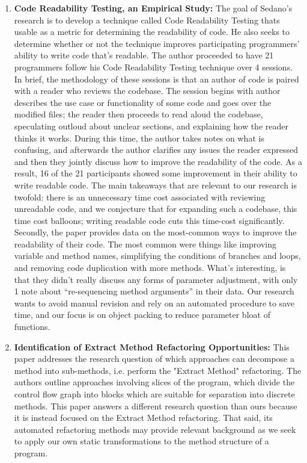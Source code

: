 \documentclass{article}
\begin{document}
\begin{enumerate}
    \item \textbf{Code Readability Testing, an Empirical Study:} The goal of Sedano’s research is to develop a technique called Code Readability Testing thats usable as a metric for determining the readability of code. He also seeks to determine whether or not the technique improves participating programmers’ ability to write code that’s readable. The author proceeded to have 21 programmers follow his Code Readability Testing technique over 4 sessions. In brief, the methodology of these sessions is that an author of code is paired with a reader who reviews the codebase. The session begins with author describes the use case or functionality of some code and goes over the modified files; the reader then proceeds to read aloud the codebase, speculating outloud about unclear sections, and explaining how the reader thinks it works. During this time, the author takes notes on what is confusing, and afterwards the author clarifies any issues the reader expressed and then they jointly discuss how to improve the readability of the code. As a result, 16 of the 21 participants showed some improvement in their ability to write readable code. The main takeaways that are relevant to our research is twofold: there is an unnecessary time cost associated with reviewing unreadable code, and we conjecture that for expanding such a codebase, this time cost balloons; writing readable code cuts this time-cost significantly. Secondly, the paper provides data on the most-common ways to improve the readability of their code. The most common were things like improving variable and method names, simplifying the conditions of branches and loops, and removing code duplication with more methods. What’s interesting, is that they didn’t really discuss any forms of parameter adjustment, with only 1 note about “re-sequencing method arguments”\cite{7474473} in their data. Our research wants to avoid manual revision and rely on an automated procedure to save time, and our focus is on object packing to reduce parameter bloat of functions. 

    \item \textbf{Identification of Extract Method Refactoring Opportunities:} This paper addresses the research question of which approaches can decompose a method into sub-methods, i.e. perform the "Extract Method"\cite{4812745} refactoring. The authors outline approaches involving slices of the program, which divide the control flow graph into blocks which are suitable for separation into discrete methods. This paper answers a different research question than ours because it is instead focused on the Extract Method refactoring. That said, its automated refactoring methods may provide relevant background as we seek to apply our own static transformations to the method structure of a program.


\end{enumerate}
\end{document}
